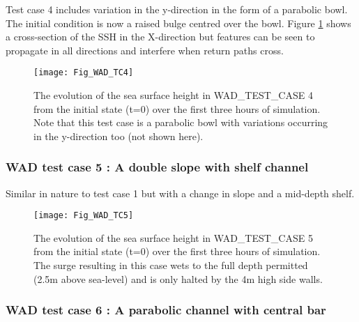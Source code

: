 Test case 4 includes variation in the y-direction in the form of a parabolic bowl. The
initial condition is now a raised bulge centred over the bowl. Figure \ref{Fig_WAD_TC4}
shows a cross-section of the SSH in the X-direction but features can be seen to propagate
in all directions and interfere when return paths cross.


\begin{figure}[htb] \begin{center}
\texttt{[image: Fig\_WAD\_TC4]}
\caption{ \label{Fig_WAD_TC4}
The evolution of the sea surface height in WAD\_TEST\_CASE 4 from the initial state (t=0)
over the first three hours of simulation. Note that this test case is a parabolic bowl with
variations occurring in the y-direction too (not shown here).}
\end{center}\end{figure}

\clearpage
\subsubsection [WAD test case 5 : A double slope with shelf channel ]
                    {WAD test case 5 : A double slope with shelf channel}
\label{WAD_test_case5}

Similar in nature to test case 1 but with a change in slope and a mid-depth shelf.


\begin{figure}[htb] \begin{center}
\texttt{[image: Fig\_WAD\_TC5]}
\caption{ \label{Fig_WAD_TC5}
The evolution of the sea surface height in WAD\_TEST\_CASE 5 from the initial state (t=0)
over the first three hours of simulation. The surge resulting in this case wets to the full 
depth permitted (2.5m above sea-level) and is only halted by the 4m high side walls.}
\end{center}\end{figure}

\clearpage
\subsubsection [WAD test case 6 : A parabolic channel with central bar ]
                    {WAD test case 6 : A parabolic channel with central bar}
\label{WAD_test_case6}


